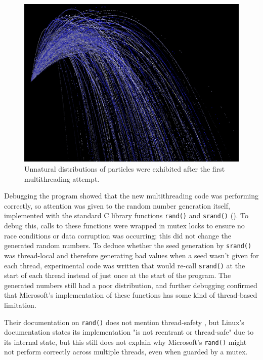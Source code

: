 \documentclass[11pt, a4paper, twocolumn]{article}
\begin{document}
\begin{figure}[h]
\includegraphics[width=\linewidth]{randombug}
\caption{Unnatural distributions of particles were exhibited after the first multithreading attempt.}
\label{fig:randombug}
\end{figure}

Debugging the program showed that the new multithreading code was performing correctly, so attention was given to the random number generation itself, implemented with the standard C library functions \verb|rand()| and \verb|srand()| (\citeyear{CLibRand}). To debug this, calls to these functions were wrapped in mutex locks to ensure no race conditions or data corruption was occurring; this did not change the generated random numbers. To deduce whether the seed generation by \verb|srand()| was thread-local and therefore generating bad values when a seed wasn't given for each thread, experimental code was written that would re-call \verb|srand()| at the start of each thread instead of just once at the start of the program. The generated numbers still had a poor distribution, and further debugging confirmed that Microsoft's implementation of these functions has some kind of thread-based limitation.

Their documentation on \verb|rand()| does not mention thread-safety \citep{CLibRandMicrosoft}, but Linux's documentation states its implementation "is not reentrant or thread-safe" \citep{CLibRandLinux} due to its internal state, but this still does not explain why Microsoft's \verb|rand()| might not perform correctly across multiple threads, even when guarded by a mutex.
\end{document}
